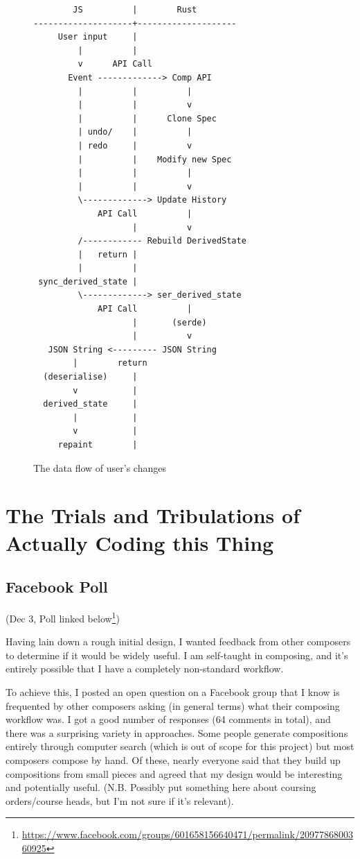 \documentclass[12pt]{article}
\newcommand{\footurl}[1]{\footnote{\url{#1}}}
\begin{document}
\begin{figure}
    \centering
    \begin{BVerbatim}
        JS          |        Rust
--------------------+--------------------
     User input     |
         |          |
         v      API Call
       Event -------------> Comp API
         |          |          |
         |          |          v
         |          |      Clone Spec
         | undo/    |          |
         | redo     |          v
         |          |    Modify new Spec
         |          |          |
         |          |          v
         \-------------> Update History
             API Call          |
                    |          v
         /------------ Rebuild DerivedState
         |   return |
         |          |
 sync_derived_state |
         \-------------> ser_derived_state
             API Call          |
                    |       (serde)
                    |          v
   JSON String <--------- JSON String
        |        return
  (deserialise)     |
        v           |
  derived_state     |
        |           |
        v           |
     repaint        |
    \end{BVerbatim}
    \caption{The data flow of user's changes}\label{fig:app_data_flow}
\end{figure}



\pagebreak

\section{The Trials and Tribulations of Actually Coding this Thing}

\subsection{Facebook Poll}

(Dec 3, Poll linked
below\footurl{https://www.facebook.com/groups/601658156640471/permalink/2097786800360925})

Having lain down a rough initial design, I wanted feedback from other composers to determine if it
would be widely useful.  I am self-taught in composing, and it's entirely possible that I have a
completely non-standard workflow.

To achieve this, I posted an open question on a Facebook group that I know is frequented by other
composers asking (in general terms) what their composing workflow was.  I got a good number of
responses (64 comments in total), and there was a surprising variety in approaches.  Some people
generate compositions entirely through computer search (which is out of scope for this project) but
most composers compose by hand.  Of these, nearly everyone said that they build up compositions from
small pieces and agreed that my design would be interesting and potentially useful.  (N.B. Possibly
put something here about coursing orders/course heads, but I'm not sure if it's relevant).
\end{document}
